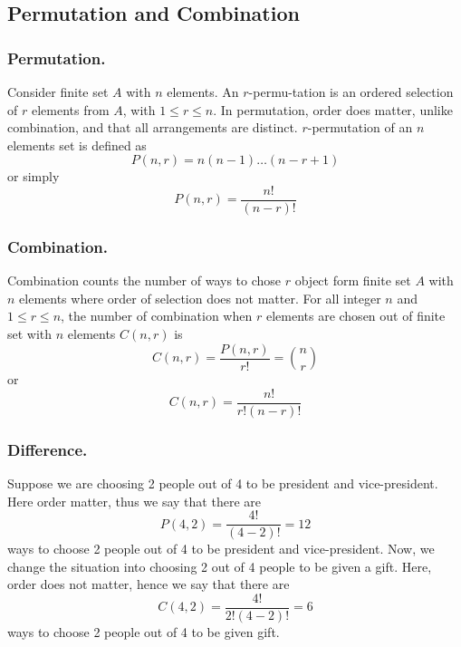 \documentclass[../../main.tex]{subfiles}
\begin{document}
\subsection*{Permutation and Combination}
\subsubsection*{Permutation.} Consider finite set $A$ with $n$ elements. An $r$-permu-tation is an ordered selection of $r$ elements from $A$, with $1\leq r\leq n$. In permutation, order does matter, unlike combination, and that all arrangements are distinct. $r$-permutation of an $n$ elements set is defined as 
\begin{equation*}
    P(n,r)=n(n-1)\dots(n-r+1)
\end{equation*}
or simply
\begin{equation*}
    P(n,r)=\frac{n!}{(n-r)!}
\end{equation*}

\subsubsection*{Combination.} Combination counts the number of ways to chose $r$ object form finite set $A$ with $n$ elements where order of selection does not matter. For all integer $n$ and $1\leq r\leq n$, the number of combination when $r$ elements are chosen out of finite set with $n$ elements $C(n,r)$ is 
\begin{equation*}
    C(n,r)=\frac{P(n,r)}{r!}={n \choose r }
\end{equation*}
or 
\begin{equation*}
    C(n,r)=\frac{n!}{r!(n-r)!}
\end{equation*}

\subsubsection*{Difference.} Suppose we are choosing 2 people out of 4 to be president and vice-president. Here order matter, thus we say that there are 
\begin{equation*}
    P(4,2)=\frac{4!}{(4-2)!}=12
\end{equation*}
ways to choose 2 people out of 4 to be president and vice-president. Now, we change the situation into choosing 2 out of 4 people to be given a gift. Here, order does not matter, hence we say that there are 
\begin{equation*}
    C(4,2)=\frac{4!}{2!(4-2)!}=6
\end{equation*}
ways to choose 2 people out of 4 to be given gift.
\end{document}
